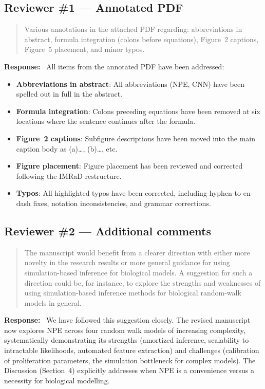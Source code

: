\documentclass[11pt,a4paper]{article}
\newenvironment{reviewercomment}{%
  \begin{quote}\itshape\color{reviewerblue}%
}{%
  \end{quote}%
}
\newcommand{\response}{\textbf{Response:}~}
\begin{document}
\subsection*{Reviewer \#1 --- Annotated PDF}

\begin{reviewercomment}
Various annotations in the attached PDF regarding: abbreviations in abstract, formula integration (colons before equations), Figure~2 captions, Figure~5 placement, and minor typos.
\end{reviewercomment}

\response
All items from the annotated PDF have been addressed:
\begin{itemize}[nosep]
  \item \textbf{Abbreviations in abstract}: All abbreviations (NPE, CNN) have been spelled out in full in the abstract.
  \item \textbf{Formula integration}: Colons preceding equations have been removed at six locations where the sentence continues after the formula.
  \item \textbf{Figure~2 captions}: Subfigure descriptions have been moved into the main caption body as (a)\ldots, (b)\ldots, etc.
  \item \textbf{Figure placement}: Figure placement has been reviewed and corrected following the IMRaD restructure.
  \item \textbf{Typos}: All highlighted typos have been corrected, including hyphen-to-en-dash fixes, notation inconsistencies, and grammar corrections.
\end{itemize}


\subsection*{Reviewer \#2 --- Additional comments}

\begin{reviewercomment}
The manuscript would benefit from a clearer direction with either more novelty in the research results or more general guidance for using simulation-based inference for biological models. A suggestion for such a direction could be, for instance, to explore the strengths and weaknesses of using simulation-based inference methods for biological random-walk models in general.
\end{reviewercomment}

\response
We have followed this suggestion closely. The revised manuscript now explores NPE across four random walk models of increasing complexity, systematically demonstrating its strengths (amortized inference, scalability to intractable likelihoods, automated feature extraction) and challenges (calibration of proliferation parameters, the simulation bottleneck for complex models). The Discussion (Section~4) explicitly addresses when NPE is a convenience versus a necessity for biological modelling.
\end{document}
